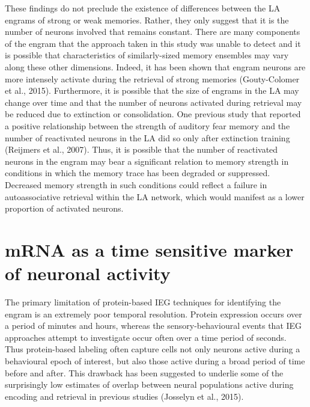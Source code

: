 \documentclass[12pt,a4paperpaper,]{report}
\begin{document}
These findings do not preclude the existence of differences between the
LA engrams of strong or weak memories. Rather, they only suggest that it
is the number of neurons involved that remains constant. There are many
components of the engram that the approach taken in this study was
unable to detect and it is possible that characteristics of
similarly-sized memory ensembles may vary along these other dimensions.
Indeed, it has been shown that engram neurons are more intensely
activate during the retrieval of strong memories (Gouty-Colomer et al.,
2015). Furthermore, it is possible that the size of engrams in the LA
may change over time and that the number of neurons activated during
retrieval may be reduced due to extinction or consolidation. One
previous study that reported a positive relationship between the
strength of auditory fear memory and the number of reactivated neurons
in the LA did so only after extinction training (Reijmers et al., 2007).
Thus, it is possible that the number of reactivated neurons in the
engram may bear a significant relation to memory strength in conditions
in which the memory trace has been degraded or suppressed. Decreased
memory strength in such conditions could reflect a failure in
autoassociative retrieval within the LA network, which would manifest as
a lower proportion of activated neurons.

\section{mRNA as a time sensitive marker of neuronal
activity}\label{mrna-as-a-time-sensitive-marker-of-neuronal-activity}

The primary limitation of protein-based IEG techniques for identifying
the engram is an extremely poor temporal resolution. Protein expression
occurs over a period of minutes and hours, whereas the
sensory-behavioural events that IEG approaches attempt to investigate
occur often over a time period of seconds. Thus protein-based labeling
often capture cells not only neurons active during a behavioural epoch
of interest, but also those active during a broad period of time before
and after. This drawback has been suggested to underlie some of the
surprisingly low estimates of overlap between neural populations active
during encoding and retrieval in previous studies (Josselyn et al.,
2015).
\end{document}

